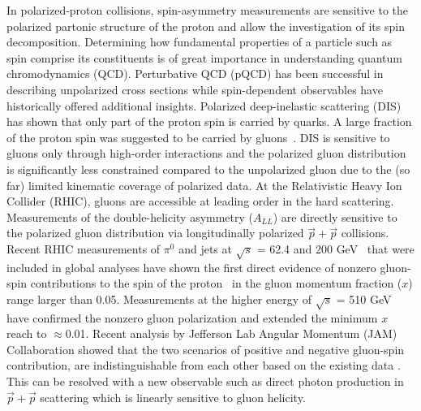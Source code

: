 \documentclass[twocolumn,letterpaper,aps,prl,longbibliography,superscriptaddress,floatfix]{revtex4-2}
\newcommand{\pizero}{\mbox{$\pi^0$}\xspace}
\newcommand{\ALL}{\mbox{$A_{LL}$}\xspace}
\begin{document}
\maketitle

\linenumbers



In polarized-proton collisions, spin-asymmetry measurements are 
sensitive to the polarized partonic structure of the proton and allow 
the investigation of its spin decomposition. Determining how fundamental 
properties of a particle such as spin comprise its constituents 
is of great importance in understanding quantum chromodynamics (QCD). 
Perturbative QCD (pQCD) has been successful in describing unpolarized 
cross sections while spin-dependent observables have historically 
offered additional insights. Polarized deep-inelastic scattering (DIS) 
has shown that only part of the proton spin is carried by quarks.
A large fraction of the proton spin was suggested to be carried by 
gluons~\cite{1988364,ASHMAN19891,PhysRevD.58.112001,ALEXAKHIN20078, 
PhysRevD.75.012007}. DIS is sensitive to gluons only through high-order 
interactions and the polarized gluon distribution is significantly less 
constrained compared to the unpolarized gluon due to the (so far) limited 
kinematic coverage of polarized data. At the Relativistic Heavy 
Ion Collider (RHIC), gluons are accessible at leading order in the hard 
scattering.  Measurements of the double-helicity asymmetry (\ALL) are 
directly sensitive to the polarized gluon distribution via 
longitudinally polarized $\vec{p}+\vec{p}$ collisions. Recent RHIC measurements 
of \pizero and jets at $\sqrt{s}$ = 62.4 and 200 
GeV~\cite{PhysRevD.90.012007,PhysRevLett.103.012003,PhysRevD.79.012003, 
PhysRevD.86.032006,PhysRevLett.115.092002} that 
were included in global analyses have shown the first direct evidence of 
nonzero gluon-spin contributions to the spin of the 
proton~\cite{PhysRevLett.113.012001, 2014276} in the gluon momentum 
fraction ($x$) range larger than 0.05. Measurements at the higher energy 
of $\sqrt{s}$ = 510 GeV~\cite{PhysRevD.93.011501,PhysRevD.100.052005} 
have confirmed the nonzero gluon polarization and extended the minimum 
$x$ reach to $\approx$0.01. Recent analysis by Jefferson Lab Angular Momentum (JAM)
Collaboration showed that the two scenarios of positive and negative gluon-spin contribution,
are indistinguishable from each other based on the existing data \cite{PhysRevD.105.074022}.
This can be resolved with a new observable such as direct photon production
in $\vec{p}+\vec{p}$ scattering which is linearly sensitive to gluon helicity.
\end{document}

